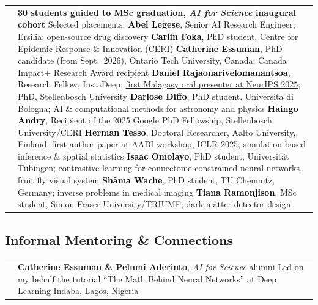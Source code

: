 \documentclass[a4paper,11pt,oneside]{article}
\makeatletter
\newcommand{\light}[1]{\textcolor{cvgray}{{\small #1}}}
\newlength{\datecol}\setlength{\datecol}{2.3cm}
\newlength{\contentcol}
\newlength{\supdatecol}\setlength{\supdatecol}{2cm}
\newlength{\supcontentcol}
\newcommand{\suprow}[2]{%
  \begingroup
  \arrayrulecolor{cvblue}%
  \setlength{\arrayrulewidth}{0.5pt}%
  \setlength{\extrarowheight}{0.5pt}%
  \noindent\begin{tabular}{@{}%
      >{\centering\arraybackslash}m{\supdatecol}%
      @{\hspace{6pt}}|@{\hspace{8pt}}%
      >{\arraybackslash}m{\supcontentcol}@{}}
    {\small #1} & #2
  \end{tabular}%
  \endgroup
  \vspace{7pt}\par}
\newcommand{\h}[1]{\vspace{10pt}\subsection{#1}}
\makeatother
\begin{document}
\suprow{2023\,--\,2024}{%
  \textbf{30 students guided to MSc graduation, \textit{AI for Science} inaugural cohort}\newline
  \light{Selected placements:}\newline
  \light{\textbf{\textcolor{black}{Abel Legese}}, Senior AI Research Engineer, Ersilia; open-source drug discovery}\newline
  \light{\textbf{\textcolor{black}{Carlin Foka}}, PhD student, Centre for Epidemic Response \& Innovation (CERI)}\newline
  \light{\textbf{\textcolor{black}{Catherine Essuman}}, PhD candidate (from Sept.\ 2026), Ontario Tech University, Canada; Canada Impact+ Research Award recipient}\newline
  \light{\textbf{\textcolor{black}{Daniel Rajaonarivelomanantsoa}}, Research Fellow, InstaDeep; \href{https://instadeep.com/2025/12/neurips-2025/}{first Malagasy oral presenter at NeurIPS 2025}; PhD, Stellenbosch University}\newline
  \light{\textbf{\textcolor{black}{Dariose Diffo}}, PhD student, Universit\`a di Bologna; AI \& computational methods for astronomy and physics}\newline
  \light{\textbf{\textcolor{black}{Haingo Andry}}, Recipient of the 2025 Google PhD Fellowship, Stellenbosch University/CERI}\newline
  \light{\textbf{\textcolor{black}{Herman Tesso}}, Doctoral Researcher, Aalto University, Finland; first-author paper at AABI workshop, ICLR 2025; simulation-based inference \& spatial statistics}\newline
  \light{\textbf{\textcolor{black}{Isaac Omolayo}}, PhD student, Universit\"at T\"ubingen; contrastive learning for connectome-constrained neural networks, fruit fly visual system}\newline
  \light{\textbf{\textcolor{black}{Sh\^ama Wache}}, PhD student, TU Chemnitz, Germany; inverse problems in medical imaging}\newline
  \light{\textbf{\textcolor{black}{Tiana Ramonjison}}, MSc student, Simon Fraser University/TRIUMF; dark matter detector design}%
}


\h{Informal Mentoring \& Connections}

\suprow{2025}{%
  {\small\textbf{Catherine Essuman \& Pelumi Aderinto}, \textit{AI for Science} alumni}\newline
  \light{Led on my behalf the tutorial ``The Math Behind Neural Networks'' at Deep Learning Indaba, Lagos, Nigeria}%
}
\end{document}
